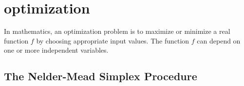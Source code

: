 \documentclass{article}
\begin{document}
 
\section{optimization}
In mathematics, an optimization problem is to maximize or minimize a real function $f$ by choosing appropriate input values. The function $f$ can depend on one or more independent variables. 	
\subsection{The Nelder-Mead Simplex Procedure}



 

\end{document}
